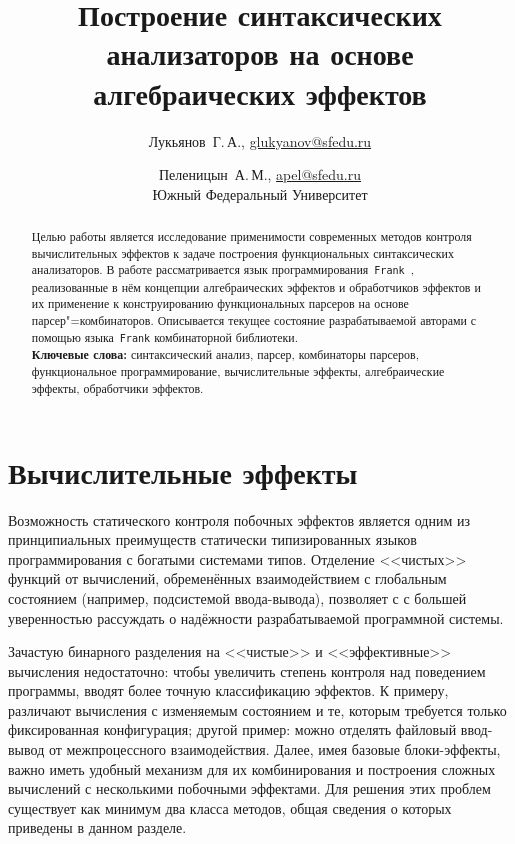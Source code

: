\documentclass [a4paper] {article}
\title %
  {Построение синтаксических анализаторов
   на основе алгебраических эффектов}
\author %
{%
  Лукьянов~Г.\,А., \url {glukyanov@sfedu.ru} \and %
  Пеленицын~А.\,М., \url {apel@sfedu.ru} \\
  Южный Федеральный Университет
}%
\date {}    %
\begin{document}

\maketitle

\begin {abstract}
  Целью работы является исследование применимости современных методов
  контроля вычислительных эффектов к задаче построения функциональных синтаксических анализаторов. В работе рассматривается язык
  программирования~\texttt{Frank}~\cite{Frank}, реализованные в нём концепции
  алгебраических эффектов и обработчиков эффектов и их применение к конструированию функциональных парсеров на основе парсер"=комбинаторов. Описывается текущее состояние
  разрабатываемой авторами с помощью языка~\texttt{Frank} комбинаторной библиотеки.
  \\ \textbf {Ключевые слова:} синтаксический анализ, парсер,
  комбинаторы парсеров, функциональное программирование, вычислительные эффекты,
  алгебраические эффекты, обработчики эффектов.
\end {abstract}


\section{Вычислительные эффекты}

Возможность статического контроля побочных эффектов является одним из
принципиальных преимуществ статически типизированных языков
программирования с богатыми системами типов. Отделение <<чистых>> функций от вычислений, обременённых
взаимодействием с глобальным состоянием (например, подсистемой ввода-вывода), позволяет с с большей уверенностью рассуждать о надёжности
разрабатываемой программной системы.

Зачастую бинарного разделения на <<чистые>> и <<эффективные>>
вычисления недостаточно: чтобы увеличить степень контроля над поведением программы,
вводят более точную классификацию эффектов. К примеру, различают вычисления с изменяемым
состоянием и те, которым требуется только фиксированная конфигурация;
другой пример: можно отделять файловый ввод-вывод от межпроцессного взаимодействия. Далее, имея
базовые блоки-эффекты, важно иметь удобный механизм для их комбинирования и
построения сложных вычислений с несколькими побочными эффектами. Для решения
этих проблем существует как минимум два класса методов, общая сведения о которых приведены в данном разделе.
\end{document}
